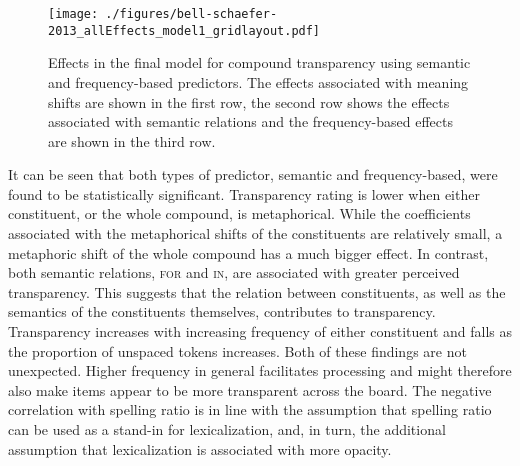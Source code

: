 \begin{figure}[!htb]
  \centering
\texttt{[image: ./figures/bell-schaefer-2013\_allEffects\_model1\_gridlayout.pdf]}
  
  \caption{Effects in the final model for compound transparency using semantic and
    frequency-based predictors. The effects associated with meaning
    shifts are shown in the first row, the second row shows the
    effects associated with semantic relations and the frequency-based
  effects are shown in the third row.}
\label{fig:bellschaefer2013_model_1}
\end{figure}

It can be seen that both types of
predictor, semantic and frequency-based, were found to be
statistically significant. 
Transparency rating is lower when
either constituent, or the whole compound, is metaphorical. While the
coefficients associated with the metaphorical shifts of the
constituents are relatively small, a metaphoric shift of the whole
compound has a much bigger effect. 
In contrast, both semantic relations, \textsc{for} and \textsc{in}, are associated
with greater perceived transparency. 
This suggests that the relation between constituents, as well as the semantics of the constituents themselves, contributes to transparency.
Transparency increases with increasing frequency of either constituent
and falls as the proportion of unspaced tokens increases. Both of
these findings are not unexpected. Higher frequency in general
facilitates processing and might therefore also make items appear to
be more transparent across the board. The
negative correlation with spelling ratio is in line with the
assumption that spelling ratio
can be used as a stand-in for lexicalization, and, in turn, the
additional assumption that 
lexicalization is associated with more opacity.


